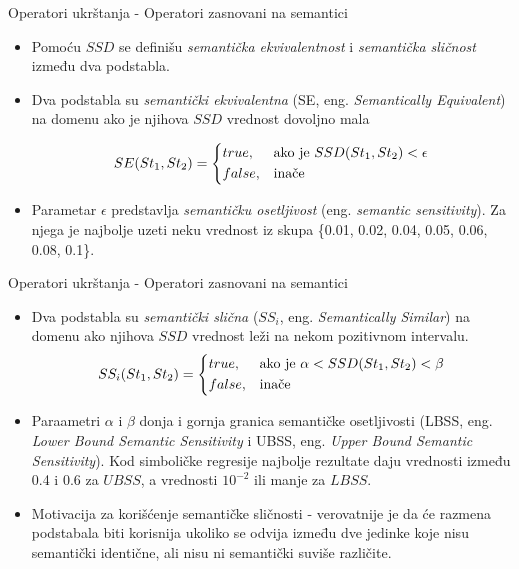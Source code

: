 \documentclass{beamer}
\begin{document}
\begin{frame}{Operatori ukrštanja - Operatori zasnovani na semantici}
\begin{itemize}
    \item Pomoću $SSD$ se definišu \textit{semantička ekvivalentnost} i \textit{semantička sličnost} između dva podstabla.
    \item Dva podstabla su \textit{semantički ekvivalentna} (SE, eng. \textit{Semantically Equivalent}) na domenu ako je njihova $SSD$ vrednost dovoljno mala
    
    \[
        SE(St_1, St_2)= 
    \begin{dcases}
        true,& \text{ako je } SSD(St_1, St_2) < \epsilon\\
        false,              & \text{inače}
    \end{dcases}
    \]
    
    \item Parametar $\epsilon$ predstavlja \textit{semantičku osetljivost} (eng. \textit{semantic sensitivity}). Za njega je najbolje uzeti neku vrednost iz skupa \{0.01, 0.02, 0.04, 0.05, 0.06, 0.08, 0.1\}.

\end{itemize}
\end{frame}
    

\begin{frame}{Operatori ukrštanja - Operatori zasnovani na semantici}
\begin{itemize}
\small
    \item Dva podstabla su \textit{semantički slična} ($SS_i$, eng. \textit{Semantically Similar}) na domenu ako njihova $SSD$ vrednost leži na nekom pozitivnom intervalu.
    \[
        SS_i(St_1, St_2)= 
    \begin{dcases}
        true,& \text{ako je } \alpha < SSD(St_1, St_2) < \beta\\
        false,              & \text{inače}
    \end{dcases}
    \]
    \item Paraametri $\alpha$ i $\beta$ donja i gornja granica semantičke osetljivosti (LBSS, eng. \textit{Lower Bound Semantic Sensitivity} i UBSS, eng. \textit{Upper Bound Semantic Sensitivity}). Kod simboličke regresije najbolje rezultate daju vrednosti između 0.4 i 0.6 za $UBSS$, a vrednosti $10^{-2}$ ili manje za $LBSS$.
    \item Motivacija za korišćenje semantičke sličnosti - verovatnije je da će razmena podstabala biti korisnija ukoliko se odvija izmed̄u dve jedinke koje nisu semantički identične, ali nisu ni semantički suviše različite.
\end{itemize}
\end{frame}
\end{document}

